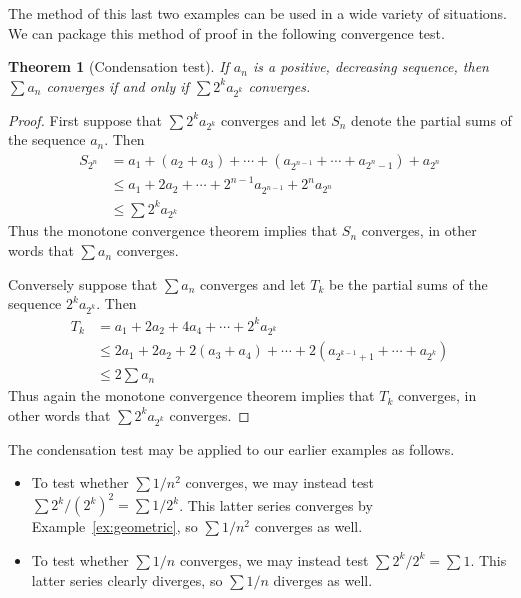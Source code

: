 \documentclass[11pt,oneside]{amsbook}
\theoremstyle{definition}
\theoremstyle{plain}
\newtheorem{thm}{Theorem}[section]
\theoremstyle{definition}
\theoremstyle{remark}
\numberwithin{equation}{section}
\numberwithin{figure}{section}
\begin{document}
The method of this last two examples can be used in a wide variety of situations. We can package this method of proof in the following convergence test.

\begin{thm}[Condensation test]
  If $a_n$ is a positive, decreasing sequence, then $\sum a_n$ converges if and only if $\sum2^ka_{2^k}$ converges.
\end{thm}


\begin{proof}
  First suppose that $\sum2^ka_{2^k}$ converges and let $S_n$ denote the partial sums of the sequence $a_n$. Then
  \begin{align*}
    S_{2^n}&=a_1+(a_2+a_3)+\cdots+(a_{2^{n-1}}+\cdots+a_{2^n-1})+a_{2^n}\\
           &\leq a_1+2a_2+\cdots+2^{n-1}a_{2^{n-1}}+2^na_{2^n}\\
           &\leq\sum2^ka_{2^k}
  \end{align*}
  Thus the monotone convergence theorem implies that $S_n$ converges, in other words that $\sum a_n$ converges.

  Conversely suppose that $\sum a_n$ converges and let $T_k$ be the partial sums of the sequence $2^ka_{2^k}$. Then
  \begin{align*}
    T_k&=a_1+2a_2+4a_4+\cdots+2^ka_{2^k}\\
       &\leq 2a_1+2a_2+2(a_3+a_4)+\cdots+2(a_{2^{k-1}+1}+\cdots+a_{2^k})\\
       &\leq 2\sum a_n
  \end{align*}
  Thus again the monotone convergence theorem implies that $T_k$ converges, in other words that $\sum2^ka_{2^k}$ converges.
\end{proof}

The condensation test may be applied to our earlier examples as follows.
\begin{itemize}
\item To test whether $\sum1/n^2$ converges, we may instead test $\sum2^k/(2^k)^2=\sum1/2^k$. This latter series converges by Example~\ref{ex:geometric}, so $\sum1/n^2$ converges as well.
\item To test whether $\sum1/n$ converges, we may instead test $\sum2^k/2^k=\sum1$. This latter series clearly diverges, so $\sum1/n$ diverges as well.
\end{itemize}

\end{document}
